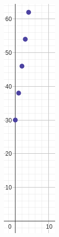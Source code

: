 \begin{minipage}[t][][b]{0.2\textwidth}
    \begin{figure}[H]
        \centering
        \includegraphics[width=0.5\linewidth]{../images/20230320232504}
        \caption{}%
        \label{fig:20230320232504}
    \end{figure}
\end{minipage}
